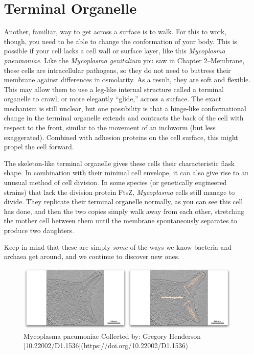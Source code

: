 \documentclass[]{tufte-book}
\begin{document}
\section{Terminal Organelle}\label{terminal-organelle}

Another, familiar, way to get across a surface is to walk. For this to
work, though, you need to be able to change the conformation of your
body. This is possible if your cell lacks a cell wall or surface layer,
like this \emph{Mycoplasma pneumoniae}. Like the \emph{Mycoplasma
genitalium} you saw in Chapter 2--Membrane, these cells are
intracellular pathogens, so they do not need to buttress their membrane
against differences in osmolarity. As a result, they are soft and
flexible. This may allow them to use a leg-like internal structure
called a terminal organelle to crawl, or more elegantly ``glide,''
across a surface. The exact mechanism is still unclear, but one
possibility is that a hinge-like conformational change in the terminal
organelle extends and contracts the back of the cell with respect to the
front, similar to the movement of an inchworm (but less exaggerated).
Combined with adhesion proteins on the cell surface, this might propel
the cell forward.

The skeleton-like terminal organelle gives these cells their
characteristic flask shape. In combination with their minimal cell
envelope, it can also give rise to an unusual method of cell division.
In some species (or genetically engineered strains) that lack the
division protein FtsZ, \emph{Mycoplasma} cells still manage to divide.
They replicate their terminal organelle normally, as you can see this
cell has done, and then the two copies simply walk away from each other,
stretching the mother cell between them until the membrane spontaneously
separates to produce two daughters.

Keep in mind that these are simply \emph{some} of the ways we know
bacteria and archaea get around, and we continue to discover new ones.

\begin{figure}
\includegraphics{movie_stills/6_12} \caption[Mycoplasma pneumoniae Collected by]{Mycoplasma pneumoniae Collected by: Gregory Henderson [10.22002/D1.1536](https://doi.org/10.22002/D1.1536)}\label{fig:unnamed-chunk-121}
\end{figure}
\end{document}
